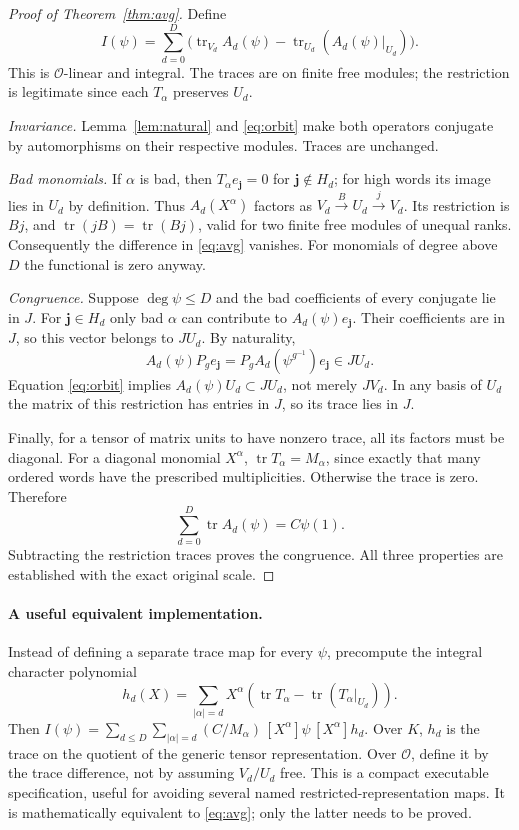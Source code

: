 \documentclass[11pt]{article}
\newcommand{\OO}{\mathcal O}
\newcommand{\tr}{\operatorname{tr}}
\begin{document}
\begin{proof}[Proof of Theorem~\ref{thm:avg}]
Define
\begin{equation}\label{eq:avg}
 I(\psi)=\sum_{d=0}^D\bigl(\tr_{V_d}A_d(\psi)-\tr_{U_d}(A_d(\psi)|_{U_d})\bigr).
\end{equation}
This is $\OO$-linear and integral. The traces are on finite free modules; the restriction is legitimate since each $T_\alpha$ preserves $U_d$.

\emph{Invariance.} Lemma~\ref{lem:natural} and \eqref{eq:orbit} make both operators conjugate by automorphisms on their respective modules. Traces are unchanged.

\emph{Bad monomials.} If $\alpha$ is bad, then $T_\alpha e_{\mathbf j}=0$ for $\mathbf j\notin H_d$; for high words its image lies in $U_d$ by definition. Thus $A_d(X^\alpha)$ factors as $V_d\xrightarrow{B}U_d\xrightarrow{j}V_d$. Its restriction is $Bj$, and $\tr(jB)=\tr(Bj)$, valid for two finite free modules of unequal ranks. Consequently the difference in \eqref{eq:avg} vanishes. For monomials of degree above $D$ the functional is zero anyway.

\emph{Congruence.} Suppose $\deg\psi\le D$ and the bad coefficients of every conjugate lie in $J$. For $\mathbf j\in H_d$ only bad $\alpha$ can contribute to $A_d(\psi)e_{\mathbf j}$. Their coefficients are in $J$, so this vector belongs to $J U_d$. By naturality,
\[
 A_d(\psi)P_g e_{\mathbf j}=P_g A_d(\psi^{g^{-1}})e_{\mathbf j}\in J U_d.
\]
Equation \eqref{eq:orbit} implies $A_d(\psi)U_d\subset J U_d$, not merely $J V_d$. In any basis of $U_d$ the matrix of this restriction has entries in $J$, so its trace lies in $J$.

Finally, for a tensor of matrix units to have nonzero trace, all its factors must be diagonal. For a diagonal monomial $X^\alpha$, $\tr T_\alpha=M_\alpha$, since exactly that many ordered words have the prescribed multiplicities. Otherwise the trace is zero. Therefore
\[
 \sum_{d=0}^D\tr A_d(\psi)=C\psi(1).
\]
Subtracting the restriction traces proves the congruence. All three properties are established with the exact original scale.
\end{proof}

\paragraph{A useful equivalent implementation.} Instead of defining a separate trace map for every $\psi$, precompute the integral character polynomial
\[
 h_d(X)=\sum_{|\alpha|=d}X^\alpha\left(\tr T_\alpha-\tr(T_\alpha|_{U_d})\right).
\]
Then $I(\psi)=\sum_{d\le D}\sum_{|\alpha|=d}(C/M_\alpha)\,[X^\alpha]\psi\,[X^\alpha]h_d$. Over $K$, $h_d$ is the trace on the quotient of the generic tensor representation. Over $\OO$, define it by the trace difference, not by assuming $V_d/U_d$ free. This is a compact executable specification, useful for avoiding several named restricted-representation maps. It is mathematically equivalent to \eqref{eq:avg}; only the latter needs to be proved.
\end{document}
